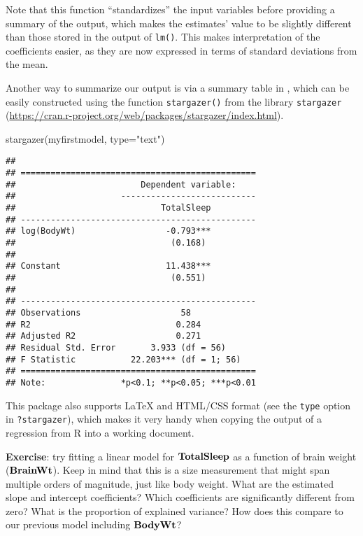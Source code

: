 \documentclass[
]{book}
\newenvironment{Shaded}{\begin{snugshade}}{\end{snugshade}}
\newcommand{\AttributeTok}[1]{\textcolor[rgb]{0.77,0.63,0.00}{#1}}
\newcommand{\FunctionTok}[1]{\textcolor[rgb]{0.00,0.00,0.00}{#1}}
\newcommand{\NormalTok}[1]{#1}
\newcommand{\StringTok}[1]{\textcolor[rgb]{0.31,0.60,0.02}{#1}}
\begin{document}
Note that this function ``standardizes'' the input variables before providing a summary of the output, which makes the estimates' value to be slightly different than those stored in the output of \texttt{lm()}. This makes interpretation of the coefficients easier, as they are now expressed in terms of standard deviations from the mean.

Another way to summarize our output is via a summary table in , which can be easily constructed using the function \texttt{stargazer()} from the library \texttt{stargazer} (\url{https://cran.r-project.org/web/packages/stargazer/index.html}).

\begin{Shaded}
\begin{Highlighting}[]
\FunctionTok{stargazer}\NormalTok{(myfirstmodel, }\AttributeTok{type=}\StringTok{"text"}\NormalTok{)}
\end{Highlighting}
\end{Shaded}

\begin{verbatim}
## 
## ===============================================
##                         Dependent variable:    
##                     ---------------------------
##                             TotalSleep         
## -----------------------------------------------
## log(BodyWt)                  -0.793***         
##                               (0.168)          
##                                                
## Constant                     11.438***         
##                               (0.551)          
##                                                
## -----------------------------------------------
## Observations                    58             
## R2                             0.284           
## Adjusted R2                    0.271           
## Residual Std. Error       3.933 (df = 56)      
## F Statistic           22.203*** (df = 1; 56)   
## ===============================================
## Note:               *p<0.1; **p<0.05; ***p<0.01
\end{verbatim}

This package also supports LaTeX and HTML/CSS format (see the \texttt{type} option in \texttt{?stargazer}), which makes it very handy when copying the output of a regression from R into a working document.

\textbf{Exercise}: try fitting a linear model for \(\bf{TotalSleep}\) as a function of brain weight (\(\bf{BrainWt}\)). Keep in mind that this is a size measurement that might span multiple orders of magnitude, just like body weight. What are the estimated slope and intercept coefficients? Which coefficients are significantly different from zero? What is the proportion of explained variance? How does this compare to our previous model including \(\bf{BodyWt}\)?
\end{document}
